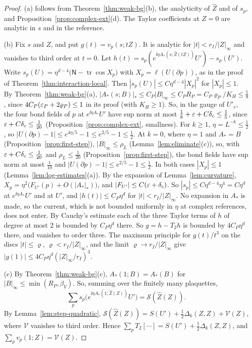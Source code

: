 \begin{proof}
(a) follows from Theorem~\ref{thm:weak-bg}(b), the analyticity of $\hat Z$ and of $s_p$, and Proposition~\ref{prop:complex-ext}(d). The Taylor coefficients at $Z=0$ are analytic in $s$ and in the reference.

(b) Fix $s$ and $Z$, and put $g(t)=v_p(s;tZ)$. It is analytic for $|t|<r_I/|Z|_\infty$ and vanishes to third order at $t=0$. Let $h(t)=s_p(e^{\ii\eta A_*(s;\hat Z(tZ))}U')-s_p(U')$. Write $s_p(U)=\eta^{d-4}\big(\mathsf N-\operatorname{tr}\cos X_p\big)$ with $X_p=\ell(U(\partial p))$, as in the proof of Theorem~\ref{thm:interaction-local}. Then $|s_p(U)|\le C\eta^{d-4}|X_p|^2$ for $|X_p|\le1$. By Theorem~\ref{thm:weak-bg}(a), $|A_*(s;B)|_*\le C_P|B|_\infty\le C_PR_P=C_P\varrho_P/K_H\le\frac18$, since $4C_P(\varepsilon_P+2\varrho_P)\le1$ in its proof (with $K_H\ge1$). So, in the gauge of $U'_r$, the four bond fields of $p$ at $e^{\ii\eta A_*}U'$ have sup norm at most $\frac18+\varepsilon+C\delta_c\le\frac15$, since $\varepsilon+C\delta_c\le\frac1{20}$ (Proposition~\ref{prop:complex-ext}, smallness). For $k\ge1$, $\eta=L^{-k}\le\frac12$, so $|U(\partial p)-1|\le e^{4\eta/5}-1\le e^{2/5}-1\le\frac12$. At $k=0$, where $\eta=1$ and $A_*=B$ (Proposition~\ref{prop:first-step}), $|B|_\infty\le\rho_L$ (Lemma~\ref{lem:eliminate}(c)), so, with $\varepsilon+C\delta_c\le\frac1{20}$ and $\rho_L\le\frac1{20}$ (Proposition~\ref{prop:first-step}), the bond fields have sup norm at most $\frac1{10}$ and $|U(\partial p)-1|\le e^{2/5}-1\le\frac12$. In both cases $|X_p|\le1$ (Lemma~\ref{lem:log-estimates}(a)). By the expansion of Lemma~\ref{lem:curvature}, $X_p=\eta^2\big(F_{U'}(p)+O(|A_*|_*)\big)$, and $|F_{U'}|\le C(\varepsilon+\delta_c)$. So $|s_p|\le C\eta^{d-4}\eta^4=C\eta^d$ at $e^{\ii\eta A_*}U'$ and at $U'$, and $|h(t)|\le C_P\eta^d$ for $|t|<r_I/|Z|_\infty$. No expansion in $A_*$ is made, so the current, which is not bounded uniformly in $\eta$ at complex references, does not enter. By Cauchy's estimate each of the three Taylor terms of $h$ of degree at most $2$ is bounded by $C_P\eta^d$ there. So $g=h-T_2h$ is bounded by $4C_P\eta^d$ there, and vanishes to order three. The maximum principle for $g(t)/t^3$ on the discs $|t|\le\varrho$, $\varrho<r_I/|Z|_\infty$, and the limit $\varrho\to r_I/|Z|_\infty$ give $|g(1)|\le4C_P\eta^d(|Z|_\infty/r_I)^3$.

(c) By Theorem~\ref{thm:weak-bg}(c), $A_*(1;B)=A_*(B)$ for $|B|_\infty\le\min(R_P,\beta_V)$. So, summing over the finitely many plaquettes,
\[
\sum_ps_p\big(e^{\ii\eta A_*(1;\hat Z(Z))}U'\big)=\mathcal S(\hat Z(Z)).
\] By Lemma~\ref{lem:step-quadratic}, $\mathcal S(\hat Z(Z))=S(U')+\frac12\Delta_k(Z,Z)+\mathcal V(Z)$, where $\mathcal V$ vanishes to third order. Hence $\sum_pT_2[\cdots]=S(U')+\frac12\Delta_k(Z,Z)$, and $\sum_pv_p(1;Z)=\mathcal V(Z)$.


\end{proof}
